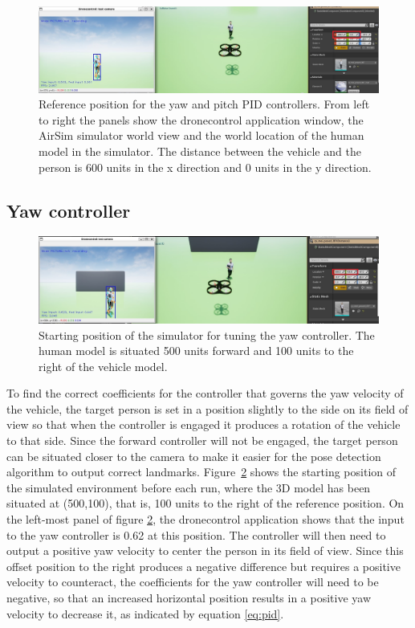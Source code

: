 \begin{figure}
  \centering
  \includegraphics[width=\textwidth, keepaspectratio]{img/tune-ref-pos.jpg}
  \caption{Reference position for the yaw and pitch PID controllers. From left to right the panels show the dronecontrol application window, the AirSim simulator world view and the world location of the human model in the simulator. The distance between the vehicle and the person is 600 units in the x direction and 0 units in the y direction.}\label{fig:tune-start-pos}
\end{figure}

\subsection{Yaw controller}

\begin{figure}
  \centering
  \includegraphics[width=\textwidth, keepaspectratio]{img/tune-ref-pos-yaw.jpg}
  \caption{Starting position of the simulator for tuning the yaw controller. The human model is situated 500 units forward and 100 units to the right of the vehicle model.}\label{fig:tune-ref-pos-yaw}
\end{figure}

To find the correct coefficients for the controller that governs the yaw velocity of the vehicle, the target person is set in a position slightly to the side on its field of view so that when the controller is engaged it produces a rotation of the vehicle to that side.
Since the forward controller will not be engaged, the target person can be situated closer to the camera to make it easier for the pose detection algorithm to output correct landmarks.
Figure~\ref{fig:tune-ref-pos-yaw} shows the starting position of the simulated environment before each run, where the 3D model has been situated at (500,100), that is, 100 units to the right of the reference position.
On the left-most panel of figure \ref{fig:tune-ref-pos-yaw}, the dronecontrol application shows that the input to the yaw controller is 0.62 at this position.
The controller will then need to output a positive yaw velocity to center the person in its field of view. 
Since this offset position to the right produces a negative difference but requires a positive velocity to counteract, the coefficients for the yaw controller will need to be negative, so that an increased horizontal position results in a positive yaw velocity to decrease it, as indicated by equation \ref{eq:pid}.

